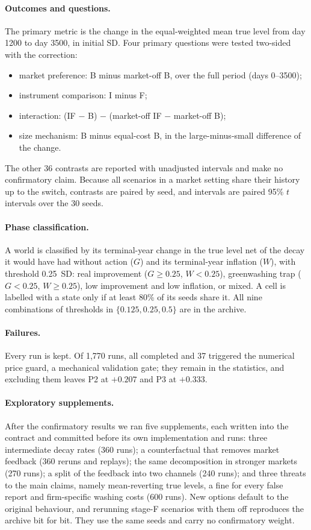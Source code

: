 \documentclass[11pt]{article}
\begin{document}
\paragraph{Outcomes and questions.} The primary metric is the change in the equal-weighted mean true level from day 1200 to day 3500, in initial SD. Four primary questions were tested two-sided with the \citet{holm1979simple} correction:
\begin{itemize}[leftmargin=*]
\item[P1] market preference: B minus market-off B, over the full period (days 0--3500);
\item[P2] instrument comparison: I minus F;
\item[P3] interaction: (IF $-$ B) $-$ (market-off IF $-$ market-off B);
\item[P4] size mechanism: B minus equal-cost B, in the large-minus-small difference of the change.
\end{itemize}
The other 36 contrasts are reported with unadjusted intervals and make no confirmatory claim. Because all scenarios in a market setting share their history up to the switch, contrasts are paired by seed, and intervals are paired 95\% $t$ intervals over the 30 seeds.

\paragraph{Phase classification.} A world is classified by its terminal-year change in the true level net of the decay it would have had without action ($G$) and its terminal-year inflation ($W$), with threshold 0.25~SD: real improvement ($G \ge 0.25$, $W < 0.25$), greenwashing trap ($G < 0.25$, $W \ge 0.25$), low improvement and low inflation, or mixed. A cell is labelled with a state only if at least 80\% of its seeds share it. All nine combinations of thresholds in $\{0.125, 0.25, 0.5\}$ are in the archive.

\paragraph{Failures.} Every run is kept. Of 1,770 runs, all completed and 37 triggered the numerical price guard, a mechanical validation gate; they remain in the statistics, and excluding them leaves P2 at $+0.207$ and P3 at $+0.333$.

\paragraph{Exploratory supplements.} After the confirmatory results we ran five supplements, each written into the contract and committed before its own implementation and runs: three intermediate decay rates (360 runs); a counterfactual that removes market feedback (360 reruns and replays); the same decomposition in stronger markets (270 runs); a split of the feedback into two channels (240 runs); and three threats to the main claims, namely mean-reverting true levels, a fine for every false report and firm-specific washing costs (600 runs). New options default to the original behaviour, and rerunning stage-F scenarios with them off reproduces the archive bit for bit. They use the same seeds and carry no confirmatory weight.
\end{document}
